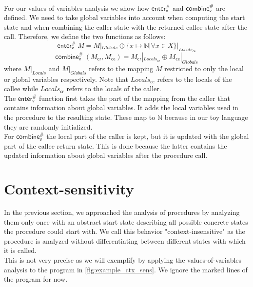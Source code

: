     \\
    For our values-of-variables analysis we show how $\textsf{enter}^{\#}_\textsf{v}$ and $\textsf{combine}^{\#}_\textsf{v}$ are defined. We need to take global variables into account when computing the start state and when combining the caller state with the returned callee state after the call. Therefore, we define the two functions as follows:
    \[\textsf{enter}^{\#}_\textsf{v}\ M = M|_{Globals} \oplus \{x \mapsto \mathbb{N} | \forall x \in X\}|_{Locals_\textsf{ce}} \]
    \[\textsf{combine}^{\#}_\textsf{v}\ (M_\textsf{cr}, M_\textsf{ce}) = M_\textsf{cr}|_{Locals_\textsf{cr}} \oplus M_\textsf{ce}|_{Globals} \]
    where $M|_{Locals}$ and $M|_{Globals}$ refers to the mapping $M$ restricted to only the local or global variables respectively. Note that $Locals_\textsf{ce}$ refers to the locals of the callee while $Locals_\textsf{cr}$ refers to the locals of the caller.\\
    The $\textsf{enter}^{\#}_\textsf{v}$ function first takes the part of the mapping from the caller that contains information about global variables. It adds the local variables used in the procedure to the resulting state. These map to $\mathbb{N}$ because in our toy language they are randomly initialized.\\
    For $\textsf{combine}^{\#}_\textsf{v}$ the local part of the caller is kept, but it is updated with the global part of the callee return state. This is done because the latter contains the updated information about global variables after the procedure call.\\

  \section{Context-sensitivity}
    In the previous section, we approached the analysis of procedures by analyzing them only once with an abstract start state describing all possible concrete states the procedure could start with. We call this behavior "context-insensitive" as the procedure is analyzed without differentiating between different states with which it is called.\\
    This is not very precise as we will exemplify by applying the values-of-variables analysis to the program in \autoref{fig:example_ctx_sens}. We ignore the marked lines of the program for now.
    
